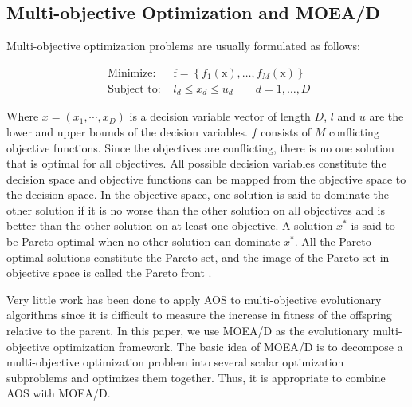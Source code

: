 \documentclass[journal]{IEEEtran}
\begin{document}
\subsection{Multi-objective Optimization and MOEA/D}
Multi-objective optimization problems are usually formulated as follows:

$$
  \begin{array}{ll}
    \text { Minimize: }   & \mathrm{f}=\left\{f_{1}(\mathrm{x}), \ldots, f_{M}(\mathrm{x})\right\} \\
    \text { Subject to: } & l_{d} \leq x_{d} \leq u_{d} \qquad d=1, \ldots, D
  \end{array}
$$

Where $x = (x_1, \cdots , x_D)$ is a decision variable vector of length $D$, $l$ and $u$ are the lower and upper bounds of the decision variables. $f$ consists of $M$ conflicting objective functions. Since the objectives are conflicting, there is no one solution that is optimal for all objectives.
All possible decision variables constitute the decision space and objective functions can be mapped from the objective space to the decision space\cite{gonccalves2017adaptive}. In the objective space, one solution is said to dominate the other solution if it is no worse than the other solution on all objectives and is better than the other solution on at least one objective.
A solution $x^*$ is said to be Pareto-optimal when no other solution can dominate $x^*$. All the Pareto-optimal solutions constitute the Pareto set, and the image of the Pareto set in objective space is called the Pareto front \cite{deb2001multi}.

Very little work has been done to apply AOS to multi-objective evolutionary algorithms since it is difficult to measure the increase in fitness of the offspring relative to the parent.
In this paper, we use MOEA/D \cite{moead} as the evolutionary multi-objective optimization framework. The basic idea of MOEA/D is to decompose a multi-objective optimization problem into several scalar optimization subproblems and optimizes them together. Thus, it is appropriate to combine AOS with MOEA/D.
\end{document}
